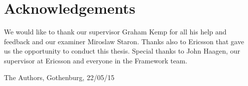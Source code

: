 \thispagestyle{plain}			%
\section*{Acknowledgements}
We would like to thank our supervisor Graham Kemp for all his help and feedback and our examiner Miroslaw Staron. Thanks also to Ericsson that gave us the opportunity to conduct this thesis. Special thanks to John Haagen, our supervisor at Ericsson and everyone in the Framework team.

\vspace{1.5cm}
\hfill
The Authors, Gothenburg, 22/05/15

\newpage				%
\thispagestyle{empty}
\mbox{}